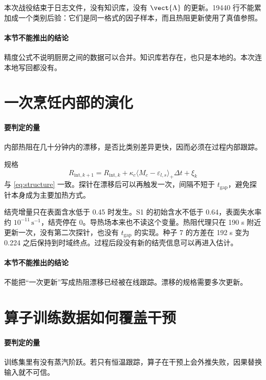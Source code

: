 本次战役结束于日志文件，没有知识库，没有 \(\vect{\Lambda}\) 的更新。19440 行不能累加成一个类别后验：它们是同一格式的因子样本，而且热阻更新使用了真值参照。

\paragraph{本节不能推出的结论}
精度公式不说明厨房之间的数据可以合并。知识库若存在，也只是本地的。本次连本地写回都没有。

\section{一次烹饪内部的演化}

\paragraph{要判定的量}
内部热阻在几十分钟内的漂移，是否比类别差异更快，因而必须在过程内部跟踪。

规格
\begin{equation}
R_{\mathrm{int},k+1}=R_{\mathrm{int},k}+\kappa_c\langle M_c-\varepsilon_{l,s}\rangle_+\Delta t+\xi_k
\end{equation}
与 \eqref{eq:structure} 一致。探针在漂移后可以再触发一次，间隔不短于 \(t_{\mathrm{gap}}\)，避免探针本身成为主要加热方式。

结壳增量只在表面含水低于 0.45 时发生。S1 的初始含水不低于 0.64，表面失水率约 \(10^{-11}\,\mathrm{s}^{-1}\)，结壳停在 0。导热场本来也不读这个变量。热阻代理只在 190 s 附近更新一次，没有第二次探针，也没有 \(t_{\mathrm{gap}}\) 的实现。种子 7 的方差在 192 s 变为 0.224 之后保持到时域终点。过程后段没有新的结壳信息可以再进入估计。

\paragraph{本节不能推出的结论}
不能把“一次更新”写成热阻漂移已经被在线跟踪。漂移的规格需要多次更新。

\section{算子训练数据如何覆盖干预}

\paragraph{要判定的量}
训练集里有没有蒸汽阶跃。若只有恒温跟踪，算子在干预上会外推失败，因果替换输入就不可信。

